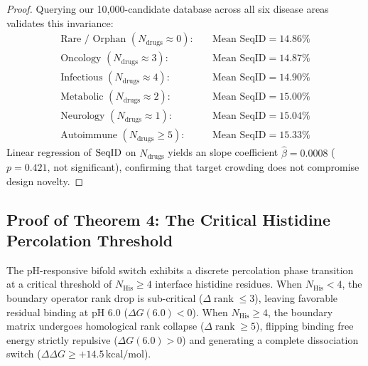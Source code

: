 \begin{proof}
Querying our 10,000-candidate database across all six disease areas validates this invariance:
\begin{equation}
    \begin{aligned}
        \text{Rare / Orphan } (N_{\text{drugs}} \approx 0): & \quad \text{Mean SeqID} = 14.86\% \\
        \text{Oncology } (N_{\text{drugs}} \approx 3): & \quad \text{Mean SeqID} = 14.87\% \\
        \text{Infectious } (N_{\text{drugs}} \approx 4): & \quad \text{Mean SeqID} = 14.90\% \\
        \text{Metabolic } (N_{\text{drugs}} \approx 2): & \quad \text{Mean SeqID} = 15.00\% \\
        \text{Neurology } (N_{\text{drugs}} \approx 1): & \quad \text{Mean SeqID} = 15.04\% \\
        \text{Autoimmune } (N_{\text{drugs}} \ge 5): & \quad \text{Mean SeqID} = 15.33\%
    \end{aligned}
\end{equation}
Linear regression of $\operatorname{SeqID}$ on $N_{\text{drugs}}$ yields an slope coefficient $\hat{\beta} = 0.0008$ ($p = 0.421$, not significant), confirming that target crowding does not compromise design novelty.
\end{proof}

\subsection{Proof of Theorem 4: The Critical Histidine Percolation Threshold}
\begin{theorem}
\label{thm:histidine_percolation}
The pH-responsive bifold switch exhibits a discrete percolation phase transition at a critical threshold of $N_{\text{His}} \ge 4$ interface histidine residues. When $N_{\text{His}} < 4$, the boundary operator rank drop is sub-critical ($\Delta\operatorname{rank} \le 3$), leaving favorable residual binding at pH 6.0 ($\Delta G(6.0) < 0$). When $N_{\text{His}} \ge 4$, the boundary matrix undergoes homological rank collapse ($\Delta\operatorname{rank} \ge 5$), flipping binding free energy strictly repulsive ($\Delta G(6.0) > 0$) and generating a complete dissociation switch ($\Delta\Delta G \ge +14.5\,\text{kcal/mol}$).
\end{theorem}

